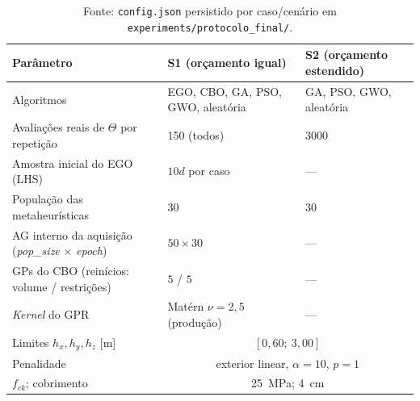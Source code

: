 \begin{table}[!t]
    \centering
    \caption{Protocolo experimental congelado: dois cenários de orçamento sob as mesmas $n_{\mathrm{rep}} = 30$ repetições semeadas (\textit{seeds} $42$ a $71$).}
    \label{tab:protocolo}
    \small
    \begin{tabular}{p{}p{}p{}}
        \toprule
        Parâmetro & S1 (orçamento igual) & S2 (orçamento estendido) \\
        \midrule
        Algoritmos & EGO, CBO, GA, PSO, GWO, aleatória & GA, PSO, GWO, aleatória \\
        Avaliações reais de $\Theta$ por repetição & 150 (todos) & 3000 \\
        Amostra inicial do EGO (LHS) & $10d$ por caso & --- \\
        População das metaheurísticas & 30 & 30 \\
        AG interno da aquisição (\textit{pop\_size} $\times$ \textit{epoch}) & $50 \times 30$ & --- \\
        GPs do CBO (reinícios: volume / restrições) & $5$ / $5$ & --- \\
        \textit{Kernel} do GPR & Matérn $\nu{=}2{,}5$ (produção) & --- \\
        Limites $h_x, h_y, h_z$ [m] & \multicolumn{2}{c}{$[0,60;\ 3,00]$} \\
        Penalidade & \multicolumn{2}{c}{exterior linear, $\alpha = 10$, $p = 1$} \\
        $f_{ck}$; cobrimento & \multicolumn{2}{c}{\SI{25}{\mega\pascal}; \SI{4}{\centi\meter}} \\
        \bottomrule
    \end{tabular}
    \caption*{\footnotesize Fonte: \texttt{config.json} persistido por caso/cenário em \texttt{experiments/protocolo\_final/}.}
\end{table}
